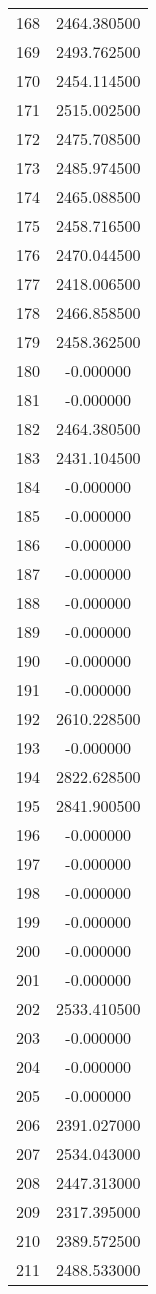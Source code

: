 \documentclass[12pt]{article}
\begin{document}
\begin{longtable}{@{}cc@{}}
168 & 2464.380500 \\
169 & 2493.762500 \\
170 & 2454.114500 \\
171 & 2515.002500 \\
172 & 2475.708500 \\
173 & 2485.974500 \\
174 & 2465.088500 \\
175 & 2458.716500 \\
176 & 2470.044500 \\
177 & 2418.006500 \\
178 & 2466.858500 \\
179 & 2458.362500 \\
180 & -0.000000 \\
181 & -0.000000 \\
182 & 2464.380500 \\
183 & 2431.104500 \\
184 & -0.000000 \\
185 & -0.000000 \\
186 & -0.000000 \\
187 & -0.000000 \\
188 & -0.000000 \\
189 & -0.000000 \\
190 & -0.000000 \\
191 & -0.000000 \\
192 & 2610.228500 \\
193 & -0.000000 \\
194 & 2822.628500 \\
195 & 2841.900500 \\
196 & -0.000000 \\
197 & -0.000000 \\
198 & -0.000000 \\
199 & -0.000000 \\
200 & -0.000000 \\
201 & -0.000000 \\
202 & 2533.410500 \\
203 & -0.000000 \\
204 & -0.000000 \\
205 & -0.000000 \\
206 & 2391.027000 \\
207 & 2534.043000 \\
208 & 2447.313000 \\
209 & 2317.395000 \\
210 & 2389.572500 \\
211 & 2488.533000 \\

\end{longtable}
\end{document}
